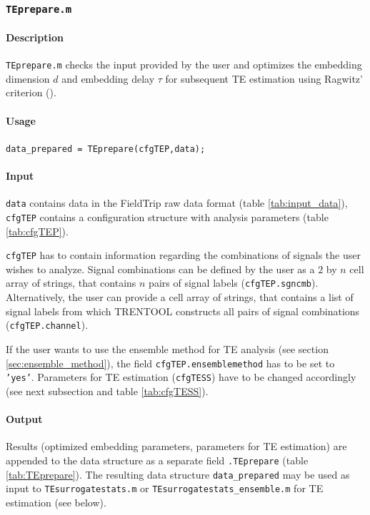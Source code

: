 \documentclass[a4paper,10pt]{article}
\begin{document}
\subsubsection{\texttt{TEprepare.m}} \label{sec:TEprepare}

\paragraph*{Description} \verb&TEprepare.m& checks the input provided by the user and optimizes the embedding dimension $d$ and embedding delay $\tau$ for subsequent TE estimation using Ragwitz' criterion (\cite{ragwitz2002}). 

\paragraph*{Usage} \verb&data_prepared = TEprepare(cfgTEP,data);&

\paragraph*{Input} \texttt{data} contains data in the FieldTrip raw data format (table \ref{tab:input_data}), \verb&cfgTEP& contains a configuration structure with analysis parameters (table \ref{tab:cfgTEP}).

\verb&cfgTEP& has to contain information regarding the combinations of signals the user wishes to analyze. Signal combinations can be defined by the user as a $2$ by $n$ cell array of strings, that contains $n$ pairs of signal labels (\texttt{cfgTEP.sgncmb}). Alternatively, the user can provide a cell array of strings, that contains a list of signal labels from which TRENTOOL constructs all pairs of signal combinations (\texttt{cfgTEP.channel}).


If the user wants to use the ensemble method for TE analysis (see section \ref{sec:ensemble_method}), the field \texttt{cfgTEP.ensemblemethod} has to be set to \texttt{'yes'}. Parameters for TE estimation (\texttt{cfgTESS}) have to be changed accordingly (see next subsection and table \ref{tab:cfgTESS}).

\paragraph*{Output} Results (optimized embedding parameters, parameters for TE estimation) are appended to the data structure as a separate field \verb&.TEprepare& (table \ref{tab:TEprepare}). The resulting data structure \texttt{data\_prepared} may be used as input to \texttt{TEsurrogatestats.m} or \texttt{TEsurrogatestats\_ensemble.m} for TE estimation (see below).
\end{document}
